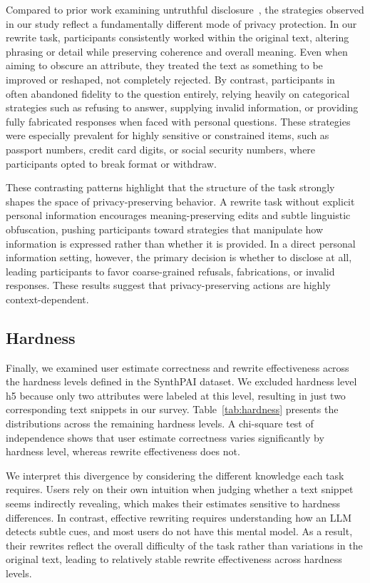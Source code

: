 Compared to prior work examining untruthful disclosure~\cite{truth2021}, the strategies observed in our study reflect a fundamentally different mode of privacy protection. In our rewrite task, participants consistently worked within the original text, altering phrasing or detail while preserving coherence and overall meaning. Even when aiming to obscure an attribute, they treated the text as something to be improved or reshaped, not completely rejected. By contrast, participants in~\cite{truth2021} often abandoned fidelity to the question entirely, relying heavily on categorical strategies such as refusing to answer, supplying invalid information, or providing fully fabricated responses when faced with personal questions. These strategies were especially prevalent for highly sensitive or constrained items, such as passport numbers, credit card digits, or social security numbers, where participants opted to break format or withdraw.

These contrasting patterns highlight that the structure of the task strongly shapes the space of privacy-preserving behavior. A rewrite task without explicit personal information encourages meaning-preserving edits and subtle linguistic obfuscation, pushing participants toward strategies that manipulate how information is expressed rather than whether it is provided. In a direct personal information setting, however, the primary decision is whether to disclose at all, leading participants to favor coarse-grained refusals, fabrications, or invalid responses. These results suggest that privacy-preserving actions are highly context-dependent.

\subsection{Hardness}
Finally, we examined user estimate correctness and rewrite effectiveness across the hardness levels defined in the SynthPAI dataset. We excluded hardness level h5 because only two attributes were labeled at this level, resulting in just two corresponding text snippets in our survey. Table~\ref{tab:hardness} presents the distributions across the remaining hardness levels. A chi-square test of independence shows that user estimate correctness varies significantly by hardness level, whereas rewrite effectiveness does not.

We interpret this divergence by considering the different knowledge each task requires. Users rely on their own intuition when judging whether a text snippet seems indirectly revealing, which makes their estimates sensitive to hardness differences. In contrast, effective rewriting requires understanding how an LLM detects subtle cues, and most users do not have this mental model. As a result, their rewrites reflect the overall difficulty of the task rather than variations in the original text, leading to relatively stable rewrite effectiveness across hardness levels.


